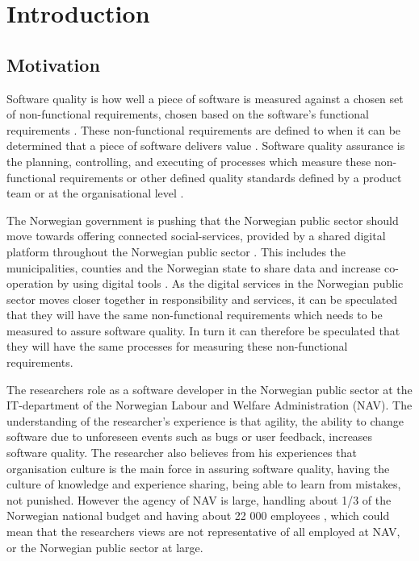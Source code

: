 \chapter{Introduction}

\section{Motivation}

Software quality is how well a piece of software is measured against a chosen set of non-functional requirements, chosen based on the software's functional requirements \cite{iso_25010:2011}. These non-functional requirements are defined to when it can be determined that a piece of software delivers value \cite{iso_25010:2011}. Software quality assurance is the planning, controlling, and executing of processes which measure these non-functional requirements or other defined quality standards defined by a product team or at the organisational level \cite{ieee_730_2014}\cite{sqa_wiki_2023}. 



The Norwegian government is pushing that the Norwegian public sector should move towards offering connected social-services, provided by a shared digital platform throughout the Norwegian public sector \cite{r_2019}. This includes the municipalities, counties and the Norwegian state to share data and increase co-operation by using digital tools \cite{r_2019}. As the digital services in the Norwegian public sector moves closer together in responsibility and services, it can be speculated that they will have the same non-functional requirements which needs to be measured to assure software quality. In turn it can therefore be speculated that they will have the same processes for measuring these non-functional requirements.

The researchers role as a software developer in the Norwegian public sector at the IT-department of the Norwegian Labour and Welfare Administration (NAV). The understanding of the researcher's experience is that agility, the ability to change software due to unforeseen events such as bugs or user feedback, increases software quality. The researcher also believes from his experiences that organisation culture is the main force in assuring software quality, having the culture of knowledge and experience sharing, being able to learn from mistakes, not punished. However the agency of NAV is large, handling about 1/3 of the Norwegian national budget \cite{nav_r_2022}\cite{bud_r_2021} and having about 22 000 employees \cite{org_nav_2023}, which could mean that the researchers views are not representative of all employed at NAV, or the Norwegian public sector at large.

